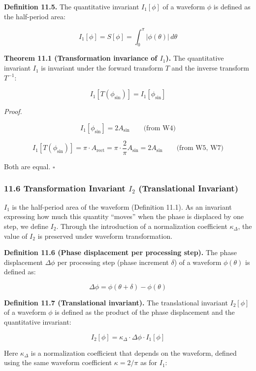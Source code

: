 \documentclass[a4paper,11pt]{article}
\begin{document}
\textbf{Definition 11.5.} The quantitative invariant \(I_1[\phi]\) of a
waveform \(\phi\) is defined as the half-period area:

\[I_1[\phi] = S[\phi] = \int_0^{\pi} |\phi(\theta)|\, d\theta \tag{W9}\]

\textbf{Theorem 11.1 (Transformation invariance of \(I_1\)).} The
quantitative invariant \(I_1\) is invariant under the forward transform
\(T\) and the inverse transform \(T^{-1}\):

\[I_1[T(\phi_{\sin})] = I_1[\phi_{\sin}]\]

\emph{Proof.}

\[I_1[\phi_{\sin}] = 2A_{\sin} \qquad \text{(from W4)}\]

\[I_1[T(\phi_{\sin})] = \pi \cdot A_{\text{rect}} = \pi \cdot \frac{2}{\pi} A_{\sin} = 2A_{\sin} \qquad \text{(from W5, W7)}\]

Both are equal. \(\square\)

\subsubsection{\texorpdfstring{11.6 Transformation Invariant \(I_2\)
(Translational
Invariant)}{11.6 Transformation Invariant I\_2 (Translational Invariant)}}\label{transformation-invariant-i_2-translational-invariant}

\(I_1\) is the half-period area of the waveform (Definition 11.1). As an
invariant expressing how much this quantity ``moves'' when the phase is
displaced by one step, we define \(I_2\). Through the introduction of a
normalization coefficient \(\kappa_\Delta\), the value of \(I_2\) is
preserved under waveform transformation.

\textbf{Definition 11.6 (Phase displacement per processing step).} The
phase displacement \(\Delta\phi\) per processing step (phase increment
\(\delta\)) of a waveform \(\phi(\theta)\) is defined as:

\[\Delta\phi = \phi(\theta + \delta) - \phi(\theta) \tag{W10}\]

\textbf{Definition 11.7 (Translational invariant).} The translational
invariant \(I_2[\phi]\) of a waveform \(\phi\) is defined as the product
of the phase displacement and the quantitative invariant:

\[I_2[\phi] = \kappa_\Delta \cdot \Delta\phi \cdot I_1[\phi] \tag{W11}\]

Here \(\kappa_\Delta\) is a normalization coefficient that depends on
the waveform, defined using the same waveform coefficient
\(\kappa = 2/\pi\) as for \(I_1\):
\end{document}

